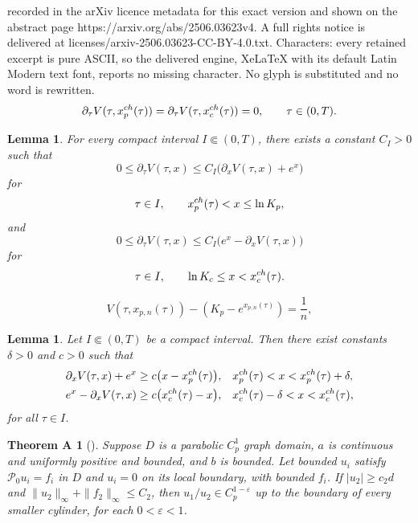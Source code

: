 \documentclass[10pt,a4paper]{amsart}
\newtheorem{lemma}[theorem]{Lemma}
\newtheorem*{bhfirst}{Theorem A}
\begin{document}
recorded in the arXiv licence metadata for this exact version and shown on the abstract page https://arxiv.org/abs/2506.03623v4. A full rights notice is delivered at licenses/arxiv-2506.03623-CC-BY-4.0.txt. Characters: every retained excerpt is pure ASCII, so the delivered engine, XeLaTeX with its default Latin Modern text font, reports no missing character. No glyph is substituted and no word is rewritten.
\begin{equation}\label{Vtau boundary}
    \partial_\tau V(\tau,x_p^{\rm ch}(\tau))
    =
    \partial_\tau V(\tau,x_c^{\rm ch}(\tau))
    =0,
    \qquad \tau\in(0,T).
\end{equation}

\begin{lemma}\label{derivative estimate FB}
For every compact interval $I\Subset(0,T)$, there exists a constant
$C_I>0$ such that
\begin{equation}\label{put derivative estimate}
    0\leq\partial_\tau V(\tau,x)
    \leq
    C_I\bigl(\partial_xV(\tau,x)+e^x\bigr)
\end{equation}
for
\[
    \tau\in I,
    \qquad
    x_p^{\rm ch}(\tau)<x\leq\ln K_p,
\]
and
\begin{equation}\label{call derivative estimate}
    0\leq\partial_\tau V(\tau,x)
    \leq
    C_I\bigl(e^x-\partial_xV(\tau,x)\bigr)
\end{equation}
for
\[
    \tau\in I,
    \qquad
    \ln K_c\leq x<x_c^{\rm ch}(\tau).
\]
\end{lemma}

\begin{equation}\label{put level curve}
    V(\tau,x_{p,n}(\tau))
    -(K_p-e^{x_{p,n}(\tau)})
    =\frac1n,
\end{equation}

\begin{lemma}\label{FB nondeg}
Let $I\Subset(0,T)$ be a compact interval.
Then there exist constants $\delta>0$ and $c>0$ such that
\begin{align}
    \partial_xV(\tau,x)+e^x
    &\geq
    c\bigl(x-x_p^{\rm ch}(\tau)\bigr),
    &&x_p^{\rm ch}(\tau)<x<x_p^{\rm ch}(\tau)+\delta,
    \label{put nondeg}\\
    e^x-\partial_xV(\tau,x)
    &\geq
    c\bigl(x_c^{\rm ch}(\tau)-x\bigr),
    &&x_c^{\rm ch}(\tau)-\delta<x<x_c^{\rm ch}(\tau),
    \label{call nondeg}
\end{align}
for all $\tau\in I$.
\end{lemma}

\begin{bhfirst}[{\cite[Theorem~1.2]{Kukuljan2022}}]
Suppose $D$ is a parabolic $C_p^1$ graph domain, $a$ is continuous
and uniformly positive and bounded, and $b$ is bounded.
Let bounded $u_i$ satisfy $\mathcal P_0u_i=f_i$ in $D$ and
$u_i=0$ on its local boundary, with bounded $f_i$.
If $|u_2|\geq c_2d$ and
$\|u_2\|_\infty+\|f_2\|_\infty\leq C_2$, then
$u_1/u_2\in C_p^{1-\varepsilon}$ up to the boundary of every smaller
cylinder, for each $0<\varepsilon<1$.
\end{bhfirst}
\end{document}
